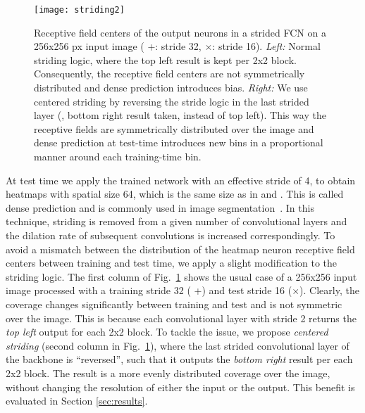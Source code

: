 \begin{figure}[t]
\centering
\texttt{[image: striding2]}\\
\caption{Receptive field centers of the output neurons in a strided FCN on a 256x256 px input image ({\color{blue} +}: stride 32, {\color{darkgreen}$\times$}: stride 16).
\textit{Left:} Normal striding logic, where the top left result is kept per 2x2 block.
Consequently, the receptive field centers are not symmetrically distributed and dense prediction introduces bias.
\textit{Right:} We use centered striding by reversing the stride logic in the last strided layer (\ie, bottom right result taken, instead of top left).
This way the receptive fields are symmetrically distributed over the image and dense prediction at test-time introduces new bins in a proportional manner around each training-time bin.
}
\label{fig:striding}
\end{figure}
At test time we apply the trained network with an effective stride of 4, to obtain heatmaps with spatial size 64, which is the same size as in \cite{Sun18ECCV} and \cite{Pavlakos17CVPR}.
This is called dense prediction and is commonly used in image segmentation~\cite{Chen18PAMI}.
In this technique, striding is removed from a given number of convolutional layers and the dilation rate of subsequent convolutions is increased correspondingly.
To avoid a mismatch between the distribution of the heatmap neuron receptive field centers between training and test time, we apply a slight modification to the striding logic.
The first column of Fig.~\ref{fig:striding} shows the usual case of a 256x256 input image processed with a training stride 32 ({\color{blue} +}) and test stride 16 ({\color{darkgreen}$\times$}).
Clearly, the coverage changes significantly between training and test and is not symmetric over the image.
This is because each convolutional layer with stride 2 returns the \emph{top left} output for each 2x2 block.
To tackle the issue, we propose \textit{centered striding} (second column in Fig.~\ref{fig:striding}), where the last strided convolutional layer of the backbone is ``reversed'', such that it outputs the \emph{bottom right} result per each 2x2 block.
The result is a more evenly distributed coverage over the image, without changing the resolution of either the input or the output.
This benefit is evaluated in Section \ref{sec:results}.
